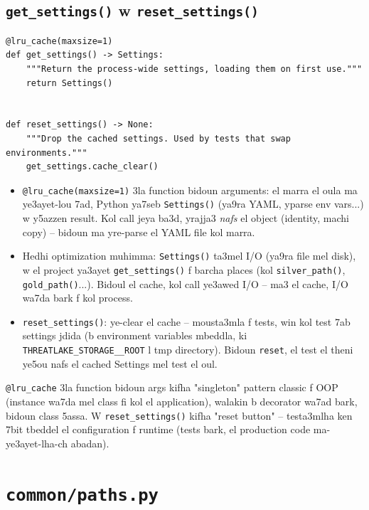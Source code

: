 \documentclass[11pt,a4paper]{report}
\DeclareRobustCommand{\code}[1]{\texttt{#1}}
\DeclareRobustCommand{\file}[1]{\texttt{\color{amber}#1}}
\begin{document}
\subsection{\code{get\_settings()} w \code{reset\_settings()}}

\begin{lstlisting}[style=pystyle]
@lru_cache(maxsize=1)
def get_settings() -> Settings:
    """Return the process-wide settings, loading them on first use."""
    return Settings()


def reset_settings() -> None:
    """Drop the cached settings. Used by tests that swap environments."""
    get_settings.cache_clear()
\end{lstlisting}

\begin{itemize}
  \item \code{@lru\_cache(maxsize=1)} 3la function bidoun arguments: el marra
        el oula ma ye3ayet-lou 7ad, Python ya7seb \code{Settings()} (ya9ra YAML,
        yparse env vars...) w y5azzen result. Kol call jeya ba3d, yrajja3
        \emph{nafs} el object (identity, machi copy) -- bidoun ma yre-parse
        el YAML file kol marra.
  \item Hedhi optimization muhimma: \code{Settings()} ta3mel I/O (ya9ra file
        mel disk), w el project ya3ayet \code{get\_settings()} f barcha places
        (kol \code{silver\_path()}, \code{gold\_path()}...). Bidoul el cache,
        kol call ye3awed I/O -- ma3 el cache, I/O wa7da bark f kol process.
  \item \code{reset\_settings()}: ye-clear el cache -- mousta3mla f tests, win
        kol test 7ab settings jdida (b environment variables mbeddla, ki
        \code{THREATLAKE\_STORAGE\_\_ROOT} l tmp directory). Bidoun \code{reset},
        el test el theni ye5ou nafs el cached Settings mel test el oul.
\end{itemize}

\begin{analogy}
\code{@lru\_cache} 3la function bidoun args kifha "singleton" pattern classic
f OOP (instance wa7da mel class fi kol el application), walakin b decorator
wa7ad bark, bidoun class 5assa. W \code{reset\_settings()} kifha "reset button"
-- testa3mlha ken 7bit tbeddel el configuration f runtime (tests bark, el
production code ma-ye3ayet-lha-ch abadan).
\end{analogy}

\section{\file{common/paths.py}}
\end{document}
